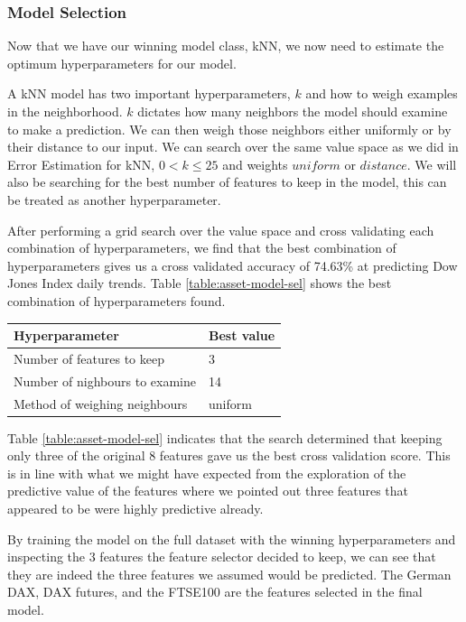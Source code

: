 \documentclass{report}
\begin{document}
\subsubsection{Model Selection}

Now that we have our winning model class, kNN, we now need to estimate the optimum hyperparameters for our model. 

A kNN model has two important hyperparameters, $k$ and how to weigh examples in the neighborhood. $k$ dictates how many neighbors the model should examine to make a prediction. We can then weigh those neighbors either uniformly or by their distance to our input. We can search over the same value space as we did in Error Estimation for kNN, $0 < k \leq 25$ and weights $uniform$ or $distance$. We will also be searching for the best number of features to keep in the model, this can be treated as another hyperparameter.

After performing a grid search over the value space and cross validating each combination of hyperparameters, we find that the best combination of hyperparameters gives us a cross validated accuracy of 74.63\% at predicting Dow Jones Index daily trends. Table \ref{table:asset-model-sel} shows the best combination of hyperparameters found.

\begin{center}
  
  \begin{tabular}{l | l}
	  \textbf{Hyperparameter} & \textbf{Best value} \\ \hline
	  Number of features to keep & 3 \\ \hline
	  Number of nighbours to examine & 14 \\ \hline
    Method of weighing neighbours & uniform
	  \label{table:asset-model-sel}
  \end{tabular}
\end{center}

Table \ref{table:asset-model-sel} indicates that the search determined that keeping only three of the original 8 features gave us the best cross validation score. This is in line with what we might have expected from the exploration of the predictive value of the features where we pointed out three features that appeared to be were highly predictive already.

By training the model on the full dataset with the winning hyperparameters and inspecting the 3 features the feature selector decided to keep, we can see that they are indeed the three features we assumed would be predicted. The German DAX, DAX futures, and the FTSE100 are the features selected in the final model.
\end{document}
